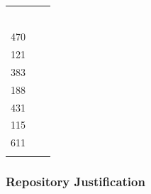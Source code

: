 \documentclass[12pt,a4paper,twoside,openany]{report} \usepackage[pdfborder={0 0 0}]{hyperref}    %
\theoremstyle{definition} \newtheorem{definition}{Definition}[section]
\begin{document}
\begin{table}[h!]
\begin{tabularx}{\textwidth}{l X c}
\begin{minipage}[t]{8cm}
    \vspace{2\DTbaselineskip}\\
    \vspace{2\DTbaselineskip}\\
    \vspace{5\DTbaselineskip}\\
    \vspace{3\DTbaselineskip}\\
    \vspace{6\DTbaselineskip}\\

      \end{minipage} & 
      \begin{minipage}[t]{0.5cm}
        2272
        \vspace{0.1\DTbaselineskip}\\
        470\\
        \vspace{\DTbaselineskip}
        121\\
        \vspace{\DTbaselineskip}
        383\\
        \vspace{1.8\DTbaselineskip}
        188\\
        \vspace{3.7\DTbaselineskip}
        431\\
        \vspace{3\DTbaselineskip}
        115\\
        \vspace{2.5\DTbaselineskip}
        611\\
      \end{minipage}
    \end{tabularx}
    \end{table}

    \FloatBarrier
    \subsubsection{Repository Justification}
\end{document}
